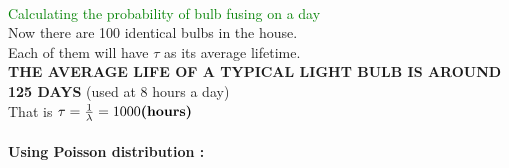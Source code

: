 \documentclass[a4paper]{article}
\begin{document}
\vspace{2 cm}\\
\textcolor{green}{\huge{Calculating the probability of bulb fusing on a day}}
\vspace{1 cm}\\
Now there are 100 identical bulbs in the house.\\
Each of them will have $\tau$ as its average lifetime.\\
\textbf{THE AVERAGE LIFE OF A TYPICAL LIGHT BULB IS AROUND 125 DAYS}
(used at 8 hours a day)\\
\huge{That is $\tau=\frac{1}{\lambda}=1000\mbox{\textbf{(hours)}}$}\\
\vspace{1 cm}\\
\textbf{Using Poisson distribution \cite{Moi60} : }\\
\end{document}
